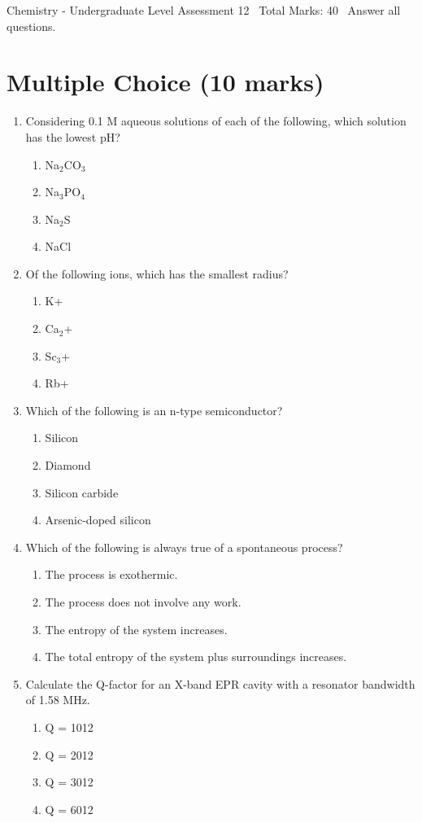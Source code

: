 \documentclass[12pt]{article}
\begin{document}
\begin{center}
Chemistry - Undergraduate Level Assessment 12 \
Total Marks: 40 \
Answer all questions.
\end{center}

\section*{Multiple Choice (10 marks)}
\begin{enumerate}[label=\arabic*.]
\item Considering 0.1 M aqueous solutions of each of the following, which solution has the lowest pH?
\begin{enumerate}[label=(\alph*)]
    \item Na$_{2}$CO$_{3}$
    \item Na$_{3}$PO$_{4}$
    \item Na$_{2}$S
    \item NaCl
\end{enumerate}
\item Of the following ions, which has the smallest radius?
\begin{enumerate}[label=(\alph*)]
    \item K+
    \item Ca$_{2}$+
    \item Sc$_{3}$+
    \item Rb+
\end{enumerate}
\item Which of the following is an n-type semiconductor?
\begin{enumerate}[label=(\alph*)]
    \item Silicon
    \item Diamond
    \item Silicon carbide
    \item Arsenic-doped silicon
\end{enumerate}
\item Which of the following is always true of a spontaneous process?
\begin{enumerate}[label=(\alph*)]
    \item The process is exothermic.
    \item The process does not involve any work.
    \item The entropy of the system increases.
    \item The total entropy of the system plus surroundings increases.
\end{enumerate}
\item Calculate the Q-factor for an X-band EPR cavity with a resonator bandwidth of 1.58 MHz.
\begin{enumerate}[label=(\alph*)]
    \item Q = 1012
    \item Q = 2012
    \item Q = 3012
    \item Q = 6012
\end{enumerate}
\end{enumerate}
\end{document}
